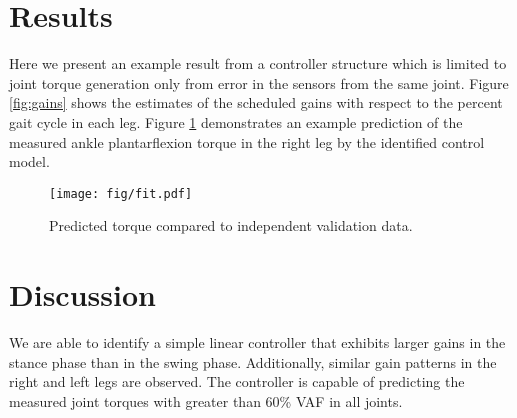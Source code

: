 \documentclass[10pt,letterpaper,notitlepage,twocolumn]{article}
\begin{document}
\section*{Results}
%
Here we present an example result from a controller structure which is limited to
joint torque generation only from error in the sensors from the same joint.
Figure \ref{fig:gains} shows the estimates of the scheduled gains with respect
to the percent gait cycle in each leg. Figure \ref{fig:fit} demonstrates an example
prediction of the measured ankle plantarflexion torque in the right leg by the
identified control model.
%
\begin{figure}[b]
  \begin{center}
    \texttt{[image: fig/fit.pdf]}
    \caption{Predicted torque compared to independent validation data.}
    \label{fig:fit}
  \end{center}
\end{figure}
%
\section*{Discussion}
%
We are able to identify a simple linear controller that exhibits larger gains
in the stance phase than in the swing phase.  Additionally, similar
gain patterns in the right and left legs are observed. The controller is capable
of predicting the measured joint torques with greater than 60\% VAF in all joints.
%
%
\end{document}
